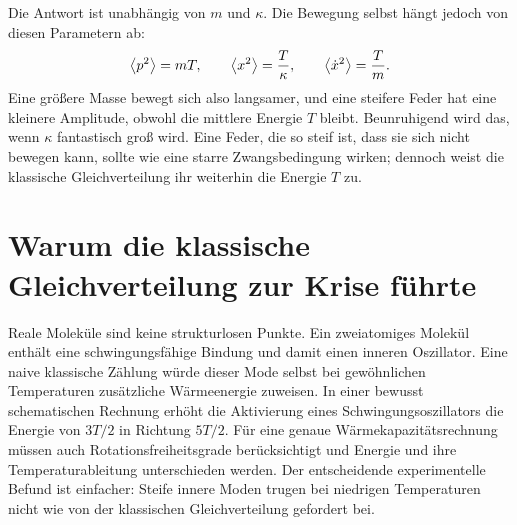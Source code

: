 Die Antwort ist unabhängig von \(m\) und \(\kappa\). Die Bewegung selbst hängt jedoch von diesen Parametern ab:
\begin{equation}
 \left\langle p^2\right\rangle=mT,
 \qquad
 \left\langle x^2\right\rangle=\frac{T}{\kappa},
 \qquad
 \left\langle\dot{x}^2\right\rangle=\frac{T}{m}.
 \label{eq:sm7-classical-fluctuations}
\end{equation}
Eine größere Masse bewegt sich also langsamer, und eine steifere Feder hat eine kleinere Amplitude, obwohl die mittlere Energie \(T\) bleibt. Beunruhigend wird das, wenn \(\kappa\) fantastisch groß wird. Eine Feder, die so steif ist, dass sie sich nicht bewegen kann, sollte wie eine starre Zwangsbedingung wirken; dennoch weist die klassische Gleichverteilung ihr weiterhin die Energie \(T\) zu.

\begin{classroomqa}
\end{classroomqa}

\begin{classroomqa}
\end{classroomqa}

\section{Warum die klassische Gleichverteilung zur Krise führte}

Reale Moleküle sind keine strukturlosen Punkte. Ein zweiatomiges Molekül enthält eine schwingungsfähige Bindung und damit einen inneren Oszillator. Eine naive klassische Zählung würde dieser Mode selbst bei gewöhnlichen Temperaturen zusätzliche Wärmeenergie zuweisen. In einer bewusst schematischen Rechnung erhöht die Aktivierung eines Schwingungsoszillators die Energie von \(3T/2\) in Richtung \(5T/2\). Für eine genaue Wärmekapazitätsrechnung müssen auch Rotationsfreiheitsgrade berücksichtigt und Energie und ihre Temperaturableitung unterschieden werden. Der entscheidende experimentelle Befund ist einfacher: Steife innere Moden trugen bei niedrigen Temperaturen nicht wie von der klassischen Gleichverteilung gefordert bei.

